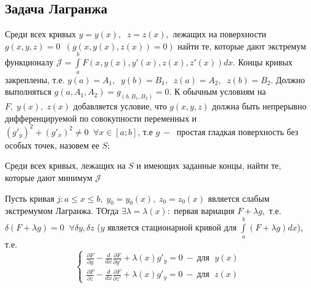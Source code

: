 \subsection{Задача Лагранжа}\par

Среди всех кривых $y=y(x),\;\; z=z(x),$ лежащих на поверхности $g(x,y,z)=0\;\;(g(x,y(x),z(x))=0)$ найти те, которые дают экстремум функционалу $\mathcal{J}=\int\limits_a^b F(x,y(x),y'(x),z(x),z'(x))d x$. Концы кривых закреплены, т.е. $y(a)=A_1, \;\; y(b)=B_1,\;\;z(a)=A_2,\;\;z(b)=B_2$.
Должно выполняться $g(a,A_1,A_2)= g_(b,B_1,B_2)=0$. К обычным условиям на $F,\;y(x),\;z(x)$ добавляется условие, что $g(x,y,z)$ должна быть непрерывно дифференцируемой по совокупности переменных и $(g'_y)^2+(g'_x)^2\neq 0\;\; \forall x\in[a;b]$, т.е $g ~-~$ простая гладкая поверхность без особых точек, назовем ее $S$;\par
Среди всех кривых, лежащих на $S$ и имеющих заданные концы, найти те, которые дают минимум $\mathcal{J}$
\begin{theorem}
Пусть кривая $j:a\leqslant x\leqslant b,\; y_0=y_0(x),\;z_0=z_0(x)$ является слабым экстремумом Лагранжа. ТОгда $\exists \lambda=\lambda(x):$ первая вариация $F+\lambda g,$ т.е. $\delta(F+\lambda g)=0 \;\; \forall \delta y, \delta z$ ($y$ является стационарной кривой для $\int\limits_a^b(F+\lambda g)d x$), т.е.
\begin{equation*}
\begin{cases}
\frac{\partial F}{\partial y} - \frac{d}{d x}\frac{\partial F}{\partial y'}+\lambda (x)g'_y=0 ~-~\text{для } \;y(x)\\
\frac{\partial F}{\partial z} - \frac{d}{d x}\frac{\partial F}{\partial z'}+\lambda (x)g'_y=0 ~-~\text{для } \;z(x)
\end{cases}\end{equation*}
\end{theorem}
